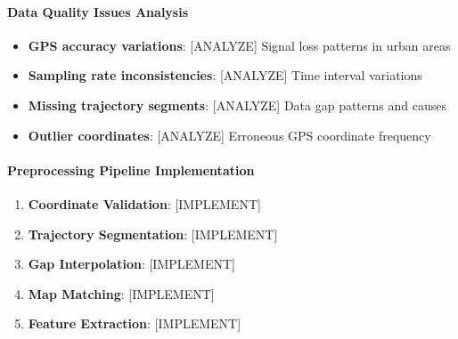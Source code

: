 \documentclass[runningheads]{llncs}
\begin{document}

\paragraph{Data Quality Issues Analysis}

\begin{itemize}
\item \textbf{GPS accuracy variations}: [ANALYZE] Signal loss patterns in urban areas
\item \textbf{Sampling rate inconsistencies}: [ANALYZE] Time interval variations
\item \textbf{Missing trajectory segments}: [ANALYZE] Data gap patterns and causes
\item \textbf{Outlier coordinates}: [ANALYZE] Erroneous GPS coordinate frequency
\end{itemize}

\paragraph{Preprocessing Pipeline Implementation}

\begin{enumerate}
\item \textbf{Coordinate Validation}: [IMPLEMENT]

\item \textbf{Trajectory Segmentation}: [IMPLEMENT]

\item \textbf{Gap Interpolation}: [IMPLEMENT]

\item \textbf{Map Matching}: [IMPLEMENT]

\item \textbf{Feature Extraction}: [IMPLEMENT]
\end{enumerate}
\end{document}
